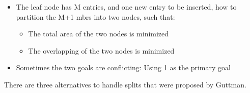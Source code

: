 \documentclass{article}
\begin{document}
\begin{itemize}
    \item The leaf node has M entries, and one new entry to be inserted, how to partition the M+1 mbrs into two nodes, such that:
    \begin{itemize}
        \item The total area of the two nodes is minimized
        \item The overlapping of the two nodes is minimized
    \end{itemize}
    \item Sometimes the two goals are conflicting: Using 1 as the primary goal
\end{itemize}

There are three alternatives to handle splits that were proposed by Guttman.
\end{document}
